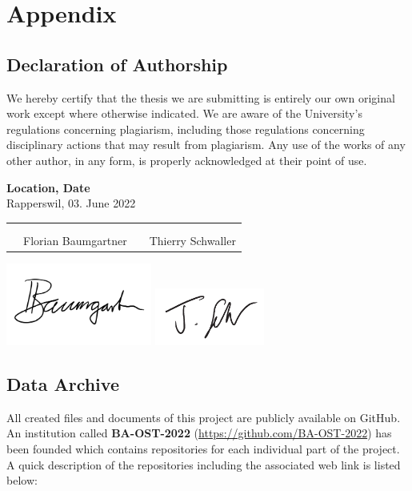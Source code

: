 \chapter{Appendix}
\clearpage

\section{Declaration of Authorship} \label{Declaration of Authorship}
We hereby certify that the thesis we are submitting is entirely our own original work except where otherwise indicated. We are aware of the University’s regulations concerning plagiarism, including those regulations concerning disciplinary actions that may result from plagiarism. Any use of the works of any other author, in any form, is properly acknowledged at their point of use.

\bigskip
\textbf{Location, Date} \\
Rapperswil, 03. June 2022

\vspace{1.2cm}
\begin{tabular}{@{}p{0.1cm}p{6cm}p{0.6cm}p{6cm}@{}}
& \hrulefill & & \hrulefill\\ \\[-0.7em]
& Florian Baumgartner & & Thierry Schwaller\\
\end{tabular}

\includegraphics[width=4.8cm, align=t, smash=br, hshift=0.9cm, vshift=2.55cm]{appendix/Signature_Florian_Baumgartner.pdf}
\includegraphics[width=3.6cm, align=t, smash=br, hshift=8.25cm, vshift=2.2cm]{appendix/Signature_Thierry_Schwaller.pdf}
\newpage

\section{Data Archive} \label{Data Archive}
All created files and documents of this project are publicly available on GitHub. An institution called \textbf{BA-OST-2022} (\url{https://github.com/BA-OST-2022}) has been founded which contains repositories for each individual part of the project.
A quick description of the repositories including the associated web link is listed below:

